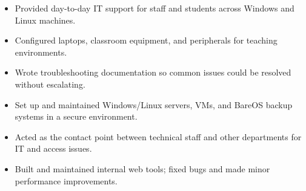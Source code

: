 \vspace{5pt}
\begin{itemize}
  \item Provided day-to-day IT support for staff and students across Windows and Linux machines.
  \item Configured laptops, classroom equipment, and peripherals for teaching environments.
  \item Wrote troubleshooting documentation so common issues could be resolved without escalating.
\end{itemize}

\vspace{5pt}
\begin{itemize}
  \item Set up and maintained Windows/Linux servers, VMs, and BareOS backup systems in a secure environment.
  \item Acted as the contact point between technical staff and other departments for IT and access issues.
\end{itemize}

\vspace{5pt}
\begin{itemize}
  \item Built and maintained internal web tools; fixed bugs and made minor performance improvements.
\end{itemize}
